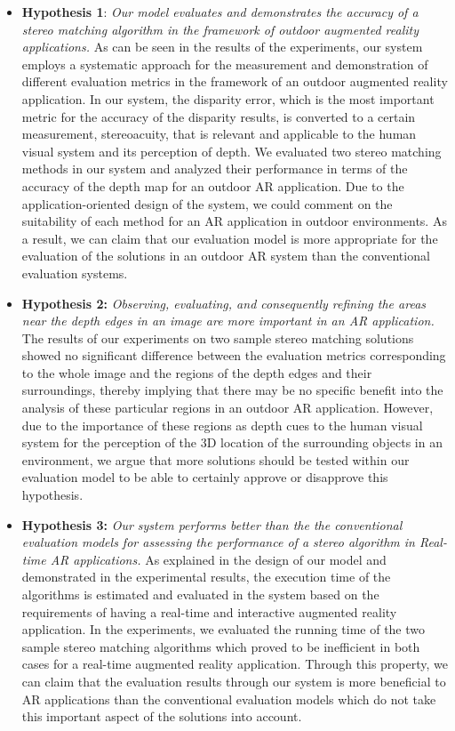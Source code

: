\begin{itemize}
\item \textbf{Hypothesis 1}: \emph{Our model evaluates and demonstrates the accuracy of a stereo matching algorithm in the framework of 
outdoor augmented reality applications.} 
As can be seen in the results of the experiments, our system employs a systematic approach for the measurement and demonstration of different 
evaluation metrics in the framework of an outdoor augmented reality application. 
In our system, the disparity error, which is the most important metric for the accuracy of the disparity results, 
is converted to a certain measurement, stereoacuity, that is relevant and applicable to the human visual
system and its perception of depth. We evaluated two stereo matching methods in our system and analyzed their performance in terms of
the accuracy of the depth map for an outdoor AR application. Due to the application-oriented design of the system, we could comment on the suitability of each method
for an AR application in outdoor environments. As a result, we can claim that our evaluation model is more appropriate for the evaluation of the solutions 
in an outdoor AR system than the conventional evaluation systems.

\item \textbf{Hypothesis 2:} \emph{Observing, evaluating, and consequently 
refining the areas near the depth edges in an image are more important in an AR application.}
The results of our experiments on two sample stereo matching solutions showed no significant difference between the evaluation metrics corresponding to the whole image and
the regions of the depth edges and their surroundings, thereby implying that there may be no specific benefit into the analysis of these particular regions 
in an outdoor AR application.
However, due to the importance of these regions as depth cues to the human visual system for the perception of the 3D location of the surrounding 
objects in an environment, we argue that more solutions should be tested within our evaluation model 
to be able to certainly approve or disapprove this hypothesis. 

\item \textbf{Hypothesis 3:} \emph{Our system performs better than the the conventional evaluation models for assessing the performance of a stereo algorithm in
Real-time AR applications.}
As explained in the design of our model and demonstrated in the experimental results, the execution time of the algorithms 
is estimated and evaluated in the system based on the requirements of having a real-time and interactive augmented reality application.
In the experiments, we evaluated the running time of the two sample stereo matching algorithms which proved to be inefficient in both cases for 
a real-time augmented reality application. Through this property, we can claim that the evaluation results through our system is more beneficial to AR applications
than the conventional evaluation models which do not take this important aspect of the solutions into account.


\end{itemize}
